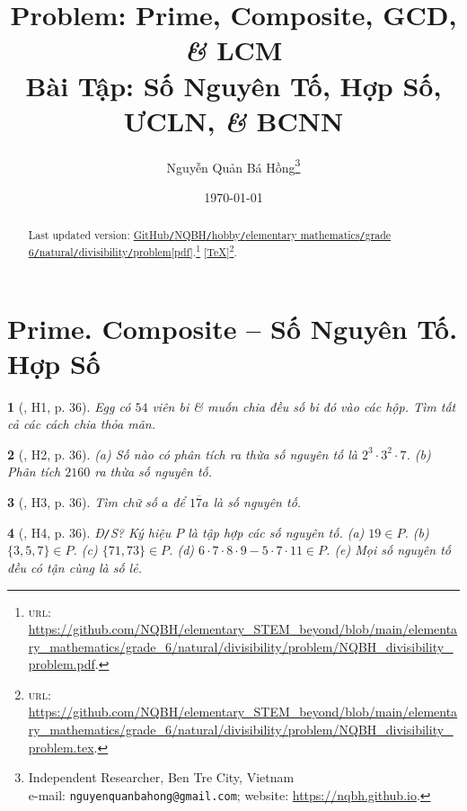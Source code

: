 \documentclass{article}
\title{Problem: Prime, Composite, GCD, {\it\&} LCM\\Bài Tập: Số Nguyên Tố, Hợp Số, ƯCLN, {\it\&} BCNN}
\author{Nguyễn Quản Bá Hồng\footnote{Independent Researcher, Ben Tre City, Vietnam\\e-mail: \texttt{nguyenquanbahong@gmail.com}; website: \url{https://nqbh.github.io}.}}
\date{\today}
\newtheorem{baitoan}{}
\begin{document}
\maketitle
\begin{abstract}
	Last updated version: \href{https://github.com/NQBH/elementary_STEM_beyond/blob/main/elementary_mathematics/grade_6/natural/divisibility/problem/NQBH_divisibility_problem.pdf}{GitHub{\tt/}NQBH{\tt/}hobby{\tt/}elementary mathematics{\tt/}grade 6{\tt/}natural{\tt/}divisibility{\tt/}problem[pdf]}.\footnote{\textsc{url}: \url{https://github.com/NQBH/elementary_STEM_beyond/blob/main/elementary_mathematics/grade_6/natural/divisibility/problem/NQBH_divisibility_problem.pdf}.} [\href{https://github.com/NQBH/elementary_STEM_beyond/blob/main/elementary_mathematics/grade_6/natural/divisibility/problem/NQBH_divisibility_problem.tex}{\TeX}]\footnote{\textsc{url}: \url{https://github.com/NQBH/elementary_STEM_beyond/blob/main/elementary_mathematics/grade_6/natural/divisibility/problem/NQBH_divisibility_problem.tex}.}. 
\end{abstract}
\tableofcontents


\section{Prime. Composite -- Số Nguyên Tố. Hợp Số}

\begin{baitoan}[\cite{Binh_boi_duong_Toan_6_tap_1}, H1, p. 36]
	Egg có $54$ viên bi \& muốn chia đều số bi đó vào các hộp. Tìm tất cả các cách chia thỏa mãn.
\end{baitoan}

\begin{baitoan}[\cite{Binh_boi_duong_Toan_6_tap_1}, H2, p. 36]
	(a) Số nào có phân tích ra thừa số nguyên tố là $2^3\cdot3^2\cdot7$. (b) Phân tích $2160$ ra thừa số nguyên tố.
\end{baitoan}

\begin{baitoan}[\cite{Binh_boi_duong_Toan_6_tap_1}, H3, p. 36]
	Tìm chữ số $a$ để $\overline{17a}$ là số nguyên tố.
\end{baitoan}

\begin{baitoan}[\cite{Binh_boi_duong_Toan_6_tap_1}, H4, p. 36]
	{\rm Đ{\tt/}S?} Ký hiệu $P$ là tập hợp các số nguyên tố. (a) $19\in P$. (b) $\{3,5,7\}\in P$. (c) $\{71,73\}\in P$. (d) $6\cdot7\cdot8\cdot9 - 5\cdot7\cdot11\in P$. (e) Mọi số nguyên tố đều có tận cùng là số lẻ.
\end{baitoan}
\end{document}
